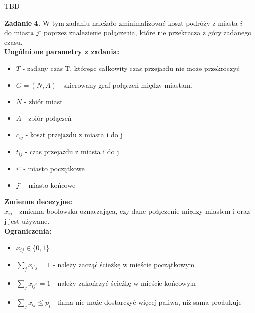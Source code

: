 \documentclass[15pt, a4paper]{article}
\begin{document}
TBD

\vspace{0.5cm}

\noindent\hrulefill

\vspace{0.5cm}



\noindent\textbf{Zadanie 4.} W tym zadaniu należało zminimalizować koszt podróży z miasta \(i^\circ\) do miasta \(j^\circ\) poprzez znalezienie połączenia, które nie przekracza z góry zadanego czasu.\\

\noindent\textbf{Uogólnione parametry z zadania:}

\begin{itemize}
    \item \( T \) - zadany czas T, którego całkowity czas przejazdu nie może przekroczyć
    \item \( G = (N, A) \) - skierowany graf połączeń między miastami
    \item \( N \) - zbiór miast
    \item \( A \) - zbiór połączeń
    \item \( c_{ij} \) - koszt przejazdu z miasta i do j
    \item \( t_{ij} \) - czas przejazdu z miasta i do j
    \item \( i^\circ \) - miasto początkowe
    \item \( j^\circ \) - miasto końcowe 
\end{itemize} 

\noindent\textbf{Zmienne decezyjne:}\\

\noindent \(x_{ij}\) - zmienna boolowska oznaczająca, czy dane połączenie między miastem i oraz j jest używane.\\

\noindent\textbf{Ograniczenia:}

\begin{itemize}
    \item \(x_{ij} \in \{0, 1\} \)
    \item \(\sum_{j}x_{i^\circ j} = 1 \) - należy zacząć ścieżkę w mieście początkowym 
    \item \(\sum_{j}x_{ij^\circ} = 1 \) - należy zakończyć ścieżkę w mieście końcowym 
    \item \(\sum_{j}x_{ij} \leq p_i \) - firma nie może dostarczyć więcej paliwa, niż sama produkuje
\end{itemize}
\end{document}
